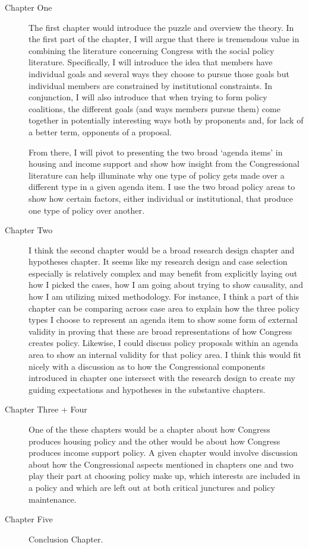 \documentclass[12pt]{article}
\begin{document}
\begin{description}
\item[Chapter One] The first chapter would introduce the puzzle and overview the theory. In the first part of the chapter, I will argue that there is tremendous value in combining the literature concerning Congress with the social policy literature. Specifically, I will introduce the idea that members have individual goals and several ways they choose to pursue those goals but individual members are constrained by institutional constraints. In conjunction, I will also introduce that when trying to form policy coalitions, the different goals (and ways members pursue them) come together in potentially interesting ways both by proponents and, for lack of a better term, opponents of a proposal.

From there, I will pivot to presenting the two broad `agenda items' in housing and income support and show how insight from the Congressional literature can help illuminate why one type of policy gets made over a different type in a given agenda item. I use the two broad policy areas to show how certain factors, either individual or institutional, that produce one type of policy over another.

\item[Chapter Two] I think the second chapter would be a broad research design chapter and hypotheses chapter. It seems like my research design and case selection especially is relatively complex and may benefit from explicitly laying out how I picked the cases, how I am going about trying to show causality, and how I am utilizing mixed methodology. For instance, I think a part of this chapter can be comparing across case area to explain how the three policy types I choose to represent an agenda item to show some form of external validity in proving that these are broad representations of how Congress creates policy. Likewise, I could discuss policy proposals within an agenda area to show an internal validity for that policy area. I think this would fit nicely with a discussion as to how the Congressional components introduced in chapter one intersect with the research design to create my guiding expectations and hypotheses in the substantive chapters.
\item[Chapter Three + Four] One of the these chapters would be a chapter about how Congress produces housing policy and the other would be about how Congress produces income support policy. A given chapter would involve discussion about how the Congressional aspects mentioned in chapters one and two play their part at choosing policy make up, which interests are included in a policy and which are left out at both critical junctures and policy maintenance. 
\item[Chapter Five] Conclusion Chapter.
\end{description}
\end{document}
